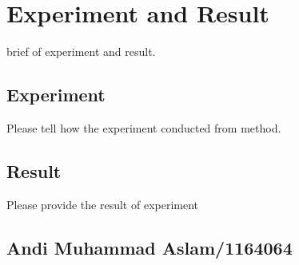 \chapter{Experiment and Result}
brief of experiment and result.
\section{Experiment}
Please tell how the experiment conducted from method.

\section{Result}
Please provide the result of experiment

\section{Andi Muhammad Aslam/1164064}

